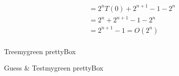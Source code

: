 \begin{align*}
&= 2^{n}T(0)+ 2^{n+1} - 1 - 2^{n}\\
&= 2^{n}+ 2^{n+1} - 1 - 2^{n}\\
&= 2^{n+1} - 1  = O(2^n)\\
\end{align*}

\begin{center}
\end{center}

\begin{prettyBox}{Tree}{mygreen}
    prettyBox
\end{prettyBox}

\begin{prettyBox}{Guess \& Test}{mygreen}
    prettyBox
\end{prettyBox}
